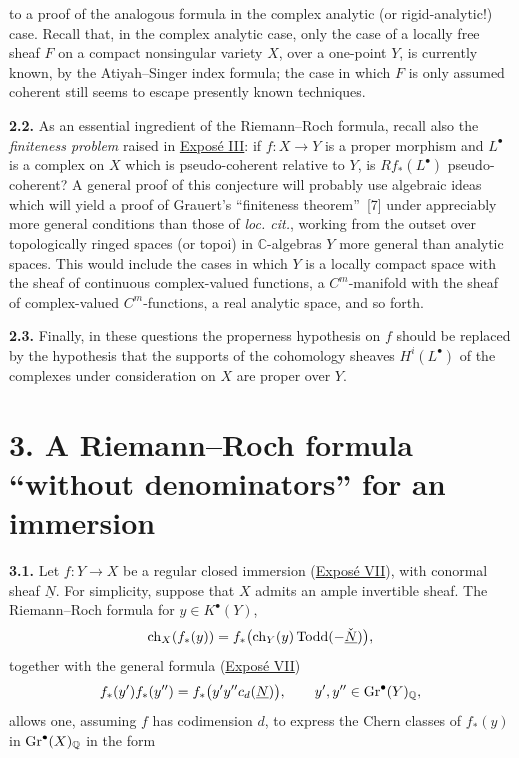 to a proof of the analogous formula in the complex analytic (or rigid-analytic!) case. Recall that, in the complex analytic case, only the case of a locally free sheaf $F$ on a compact nonsingular variety $X$, over a one-point $Y$, is currently known, by the Atiyah--Singer index formula; the case in which $F$ is only assumed coherent still seems to escape presently known techniques.

\textbf{2.2.} As an essential ingredient of the Riemann--Roch formula,
recall also the \emph{finiteness problem} raised in \hyperlink{sga6.e03.expose}{Expos\'e III}: if
$f:X\to Y$ is a proper morphism and $L^\bullet$ is a complex on $X$
which is pseudo-coherent relative to $Y$, is $Rf_*(L^\bullet)$
pseudo-coherent? A general proof of this conjecture will probably use
algebraic ideas which will yield a proof of Grauert's ``finiteness
theorem''~[7] under appreciably more general conditions than those of
\emph{loc. cit.}, working from the outset over topologically ringed
spaces (or topoi) in $\mathbb C$-algebras $Y$ more general than analytic
spaces. This would include the cases in which $Y$ is a locally compact
space with the sheaf of continuous complex-valued functions, a
$C^m$-manifold with the sheaf of complex-valued $C^m$-functions, a real
analytic space, and so forth.

\textbf{2.3.} Finally, in these questions the properness hypothesis on $f$ should be replaced by the hypothesis that the supports of the cohomology sheaves $H^i(L^\bullet)$ of the complexes under consideration on $X$ are proper over $Y$.

\section*{3. A Riemann--Roch formula ``without denominators'' for an immersion}

\textbf{3.1.} Let $f:Y\to X$ be a regular closed immersion (\hyperlink{sga6.e07.expose}{Expos\'e VII}), with conormal sheaf $\underline N$. For simplicity, suppose that $X$ admits an ample invertible sheaf. The Riemann--Roch formula for $y\in K^\bullet(Y)$,
\[
  \operatorname{ch}_X(f_*(y))
  =f_*\bigl(\operatorname{ch}_Y(y)\operatorname{Todd}(-\check{\underline N})\bigr),
\]
together with the general formula (\hyperlink{sga6.e07.expose}{Expos\'e VII})
\[
  f_*(y')f_*(y'')
  =f_*\bigl(y'y''c_d(\underline N)\bigr),
  \qquad y',y''\in\operatorname{Gr}^\bullet(Y)_{\mathbb Q},
\]
allows one, assuming $f$ has codimension $d$, to express the Chern classes of $f_*(y)$ in $\operatorname{Gr}^\bullet(X)_{\mathbb Q}$ in the form

